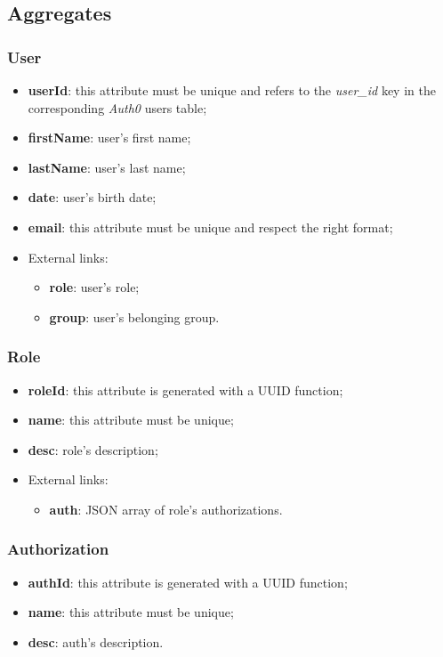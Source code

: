 \newpage
{}
\subsection{Aggregates}
\subsubsection{User}
\begin{itemize}
	\item \textbf{userId}: this attribute must be unique and refers to the \emph{user\_id} key in the corresponding \emph{Auth0} users table;
	\item \textbf{firstName}: user's first name;
	\item \textbf{lastName}: user's  last name;
	\item \textbf{date}: user's birth date;
	\item \textbf{email}: this attribute must be unique and respect the right format;
	\item External links:
	\begin{itemize}
		\item \textbf{role}: user's role;
		\item \textbf{group}: user's belonging group.
	\end{itemize}
\end{itemize}

\subsubsection{Role}
\begin{itemize}
	\item \textbf{roleId}: this attribute is generated with a UUID function;
	\item \textbf{name}: this attribute must be unique;
	\item \textbf{desc}: role's description;
	\item External links:
	\begin{itemize}
		\item \textbf{auth}: JSON array of role's authorizations.
	\end{itemize}
\end{itemize}

\subsubsection{Authorization}
\begin{itemize}
	\item \textbf{authId}: this attribute is generated with a UUID function;
	\item \textbf{name}: this attribute must be unique;
	\item \textbf{desc}: auth's description.
\end{itemize}

